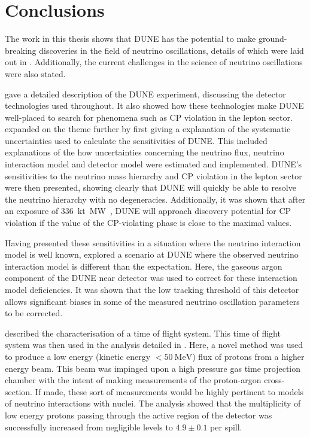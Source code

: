 \chapter{Conclusions}
\label{sec:conclusions}

The work in this thesis shows that DUNE has the potential to make ground-breaking discoveries in the field of neutrino oscillations, details of which were laid out in . 
Additionally, the current challenges in the science of neutrino oscillations were also stated.

 gave a detailed description of the DUNE experiment, discussing the detector technologies used throughout.
It also showed how these technologies make DUNE well-placed to search for phenomena such as CP violation in the lepton sector.
 expanded on the theme further by first giving a explanation of the systematic uncertainties used to calculate the sensitivities of DUNE. 
This included explanations of the how uncertainties concerning the neutrino flux, neutrino interaction model and detector model were estimated and implemented.
DUNE's sensitivities to the neutrino mass hierarchy and CP violation in the lepton sector were then presented, showing clearly that DUNE will quickly be able to resolve the neutrino hierarchy with no degeneracies.
Additionally, it was shown that after an exposure of \SI{336}{\kilo\tonne\mega\watt\year}, DUNE will approach discovery potential for CP violation if the value of the CP-violating phase is close to the maximal values.

Having presented these sensitivities in a situation where the neutrino interaction model is well known,  explored a scenario at DUNE where the observed neutrino interaction model is different than the expectation.
Here, the gaseous argon component of the DUNE near detector was used to correct for these interaction model deficiencies. 
It was shown that the low tracking threshold of this detector allows significant biases in some of the measured neutrino oscillation parameters to be corrected. 

 described the characterisation of a time of flight system.
This time of flight system was then used in the analysis detailed in .
Here, a novel method was used to produce a low energy (kinetic energy $<\SI{50}{\MeV}$) flux of protons from a higher energy beam.
This beam was impinged upon a high pressure gas time projection chamber with the intent of making measurements of the proton-argon cross-section.
If made, these sort of measurements would be highly pertinent to models of neutrino interactions with nuclei.
The analysis showed that the multiplicity of low energy protons passing through the active region of the detector was successfully increased from negligible levels to $4.9 \pm 0.1$ per spill.

